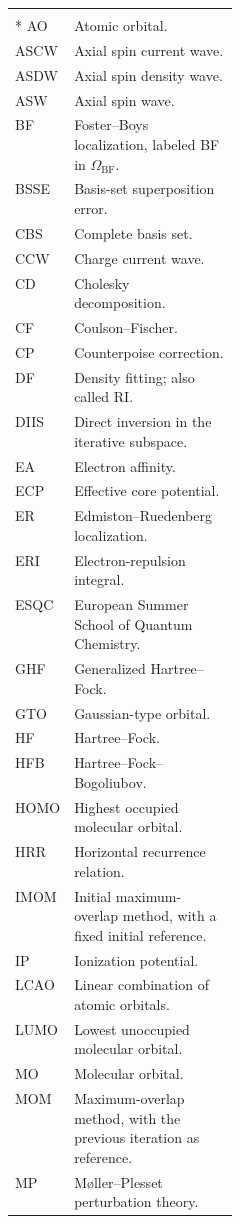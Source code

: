 \documentclass[11pt,a4paper,titlepage]{article}
\numberwithin{equation}{section}
\begin{document}
\begin{longtable}{@{}p{0.26\linewidth}p{}@{}}
  \rowcolor{hfGreenLight}
  \multicolumn{2}{@{}l@{}}{\strut\textcolor{hfGreenDark}{\textbf{Acronyms and abbreviations}}}\\*
  AO & Atomic orbital.\\
  ASCW & Axial spin current wave.\\
  ASDW & Axial spin density wave.\\
  ASW & Axial spin wave.\\
  BF & Foster--Boys localization, labeled BF in $\Omega_\text{BF}$.\\
  BSSE & Basis-set superposition error.\\
  CBS & Complete basis set.\\
  CCW & Charge current wave.\\
  CD & Cholesky decomposition.\\
  CF & Coulson--Fischer.\\
  CP & Counterpoise correction.\\
  DF & Density fitting; also called RI.\\
  DIIS & Direct inversion in the iterative subspace.\\
  EA & Electron affinity.\\
  ECP & Effective core potential.\\
  ER & Edmiston--Ruedenberg localization.\\
  ERI & Electron-repulsion integral.\\
  ESQC & European Summer School of Quantum Chemistry.\\
  GHF & Generalized Hartree--Fock.\\
  GTO & Gaussian-type orbital.\\
  HF & Hartree--Fock.\\
  HFB & Hartree--Fock--Bogoliubov.\\
  HOMO & Highest occupied molecular orbital.\\
  HRR & Horizontal recurrence relation.\\
  IMOM & Initial maximum-overlap method, with a fixed initial reference.\\
  IP & Ionization potential.\\
  LCAO & Linear combination of atomic orbitals.\\
  LUMO & Lowest unoccupied molecular orbital.\\
  MO & Molecular orbital.\\
  MOM & Maximum-overlap method, with the previous iteration as reference.\\
  MP & M{\o}ller--Plesset perturbation theory.\\

\end{longtable}
\end{document}
